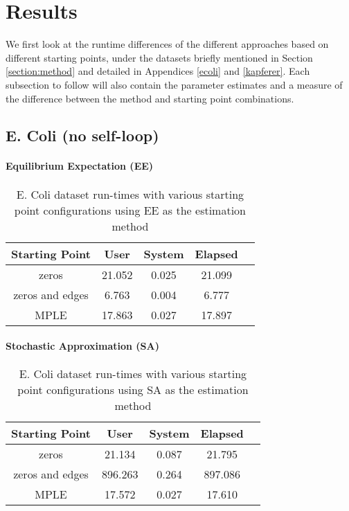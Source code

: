 \section{Results}
\label{sec:results}

We first look at the runtime differences of the different approaches based on different starting points, under the datasets briefly mentioned in Section \ref{section:method} and detailed in Appendices \ref{ecoli} and \ref{kapferer}. Each subsection to follow will also contain the parameter estimates and a measure of the difference between the method and starting point combinations.

\subsection{E. Coli (no self-loop)}

\paragraph{Equilibrium Expectation (EE)}

\begin{table}[!ht]
 \centering
 \begin{tabular}{||c | c | c | c | c||} 
 \hline
 Starting Point & User & System & Elapsed \\
 \hline\hline
 zeros & 21.052 & 0.025 & 21.099 \\ 
 \hline
 zeros and edges & 6.763 & 0.004 & 6.777 \\
 \hline
 MPLE & 17.863 & 0.027 & 17.897 \\
 \hline
 \end{tabular}
 \label{t:ecoli1_ee}
 \caption{E. Coli dataset run-times with various starting point configurations using EE as the estimation method}
\end{table}

\paragraph{Stochastic Approximation (SA)}

\begin{table}[!ht]
\centering
\begin{tabular}{||c | c | c | c | c||}
 \hline
 Starting Point & User & System & Elapsed \\ 
 \hline
 zeros & 21.134 & 0.087 & 21.795 \\
 \hline
 zeros and edges & 896.263 & 0.264 & 897.086 \\ 
 \hline
 MPLE & 17.572 & 0.027 & 17.610 \\
 \hline
 \end{tabular}
 \label{t:ecoli1_sa}
 \caption{E. Coli dataset run-times with various starting point configurations using SA as the estimation method}
 \end{table}

